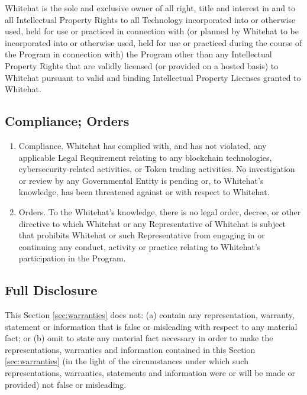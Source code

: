 \documentclass{article}
\begin{document}
Whitehat is the sole and exclusive owner of all right, title and interest in and to all Intellectual Property Rights to all Technology incorporated into or otherwise used, held for use or practiced in connection with (or planned by Whitehat to be incorporated into or otherwise used, held for use or practiced during the course of the Program in connection with) the Program other than any Intellectual Property Rights that are validly licensed (or provided on a hosted basis) to Whitehat pursuant to valid and binding Intellectual Property Licenses granted to Whitehat.

\subsection{Compliance; Orders}\label{subsec:compliance_orders}

\begin{enumerate}[label=\Alph*.]
    \item Compliance. Whitehat has complied with, and has not violated, any applicable Legal Requirement relating to any blockchain technologies, cybersecurity-related activities, or Token trading activities. No investigation or review by any Governmental Entity is pending or, to Whitehat's knowledge, has been threatened against or with respect to Whitehat.

    \item Orders. To the Whitehat's knowledge, there is no legal order, decree, or other directive to which Whitehat or any Representative of Whitehat is subject that prohibits Whitehat or such Representative from engaging in or continuing any conduct, activity or practice relating to Whitehat's participation in the Program.

\end{enumerate}

\subsection{Full Disclosure}\label{subsec:full_disclosure}

This Section \ref{sec:warranties} does not: (a) contain any representation, warranty, statement or information that is false or misleading with respect to any material fact; or (b) omit to state any material fact necessary in order to make the representations, warranties and information contained in this Section \ref{sec:warranties} (in the light of the circumstances under which such representations, warranties, statements and information were or will be made or provided) not false or misleading.
\end{document}
